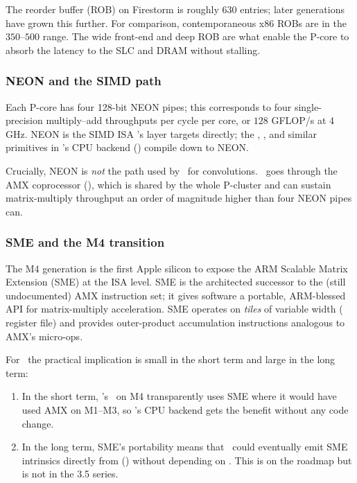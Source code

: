 The reorder buffer (ROB) on Firestorm is roughly $630$ entries; later
generations have grown this further. For comparison, contemporaneous
x86 ROBs are in the $350$--$500$ range. The wide front-end and deep
ROB are what enable the P-core to absorb the latency to the SLC and
DRAM without stalling.

\subsubsection{NEON and the SIMD path}

Each P-core has four 128-bit NEON pipes; this corresponds to four
single-precision multiply--add throughputs per cycle per core, or
$128$ GFLOP/s at 4\,GHz. NEON is the SIMD ISA \Accelerate's
 layer targets directly; the , ,
and similar primitives in \Lucid's CPU backend
() compile down to NEON.

Crucially, NEON is \emph{not} the path used by \BNNS\ for
convolutions. \BNNS\ goes through the AMX coprocessor
(), which is shared by the whole
P-cluster and can sustain matrix-multiply throughput an order of
magnitude higher than four NEON pipes can.

\subsubsection{SME and the M4 transition}

The M4 generation is the first Apple silicon to expose the ARM
Scalable Matrix Extension (SME) \cite{arm_sme_2021} at the ISA
level. SME is the architected successor to the (still
undocumented) AMX instruction set;
it gives software a portable, ARM-blessed API for matrix-multiply
acceleration. SME operates on \emph{tiles} of variable width
( register file) and provides outer-product accumulation
instructions analogous to AMX's  micro-ops.

For \Lucid\ the practical implication is small in the short term and
large in the long term:
\begin{enumerate}
  \item In the short term, \Accelerate's \BNNS\ on M4 transparently
    uses SME where it would have used AMX on M1--M3, so \Lucid's CPU
    backend gets the benefit without any code change.
  \item In the long term, SME's portability means that \Lucid\ could
    eventually emit SME intrinsics directly from 
    () without depending on \Accelerate. This
    is on the roadmap but is not in the 3.5 series.
\end{enumerate}

